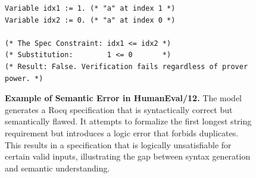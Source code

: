 \begin{figure}[t!]
\begin{tcolorbox}
\begin{tcolorbox}[
        colback=white,
        colframe=white,
        frame hidden,
        boxrule=0pt,
        sharp corners,
        top=2pt, bottom=2pt, left=2pt, right=2pt
    ]
\begin{lstlisting}
Variable idx1 := 1. (* "a" at index 1 *)
Variable idx2 := 0. (* "a" at index 0 *)

(* The Spec Constraint: idx1 <= idx2 *)
(* Substitution:        1 <= 0       *)
(* Result: False. Verification fails regardless of prover power. *)
    \end{lstlisting}
    \end{tcolorbox}

    \vspace{0.2cm}
    
    \end{tcolorbox}
    
    \caption{\textbf{Example of Semantic Error in HumanEval/12.} The model generates a Rocq specification that is syntactically correct but semantically flawed. It attempts to formalize the first longest string requirement but introduces a logic error that forbids duplicates. This results in a specification that is logically unsatisfiable for certain valid inputs, illustrating the gap between syntax generation and semantic understanding.}
    \label{fig:semantic_flaw_case}
\end{figure}
